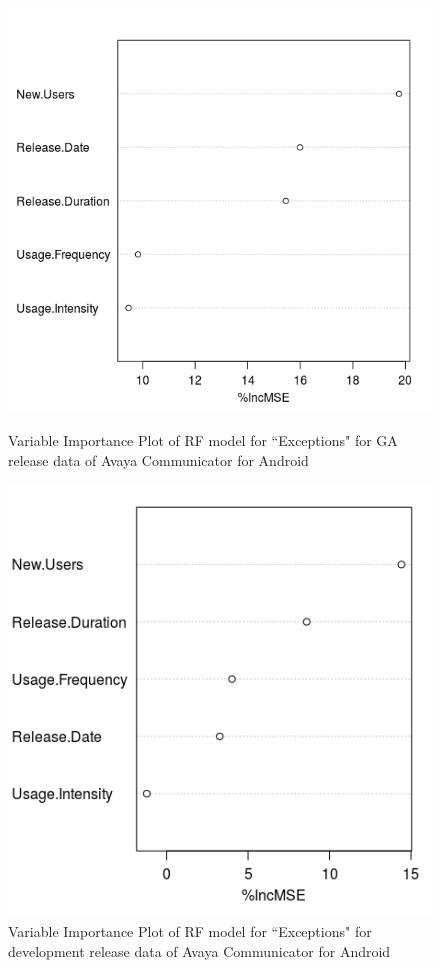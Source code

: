 \documentclass[smallcondensed]{svjour3}     %
\begin{document}
\begin{figure}[!t]
\centering
\begin{minipage}{.45\textwidth}
\includegraphics[width=\linewidth]{rfAGA}%
\caption{Variable Importance Plot of RF model for ``Exceptions" for GA release data of Avaya Communicator for Android}
\label{fig:rfAGA}
\end{minipage}
\hfill
\begin{minipage}{.45\textwidth}
\includegraphics[width=\linewidth]{rfAD}%
\caption{Variable Importance Plot of RF model for ``Exceptions" for development release data of Avaya Communicator for Android}
\label{fig:rfAD}
\end{minipage}
\end{figure}
\end{document}
